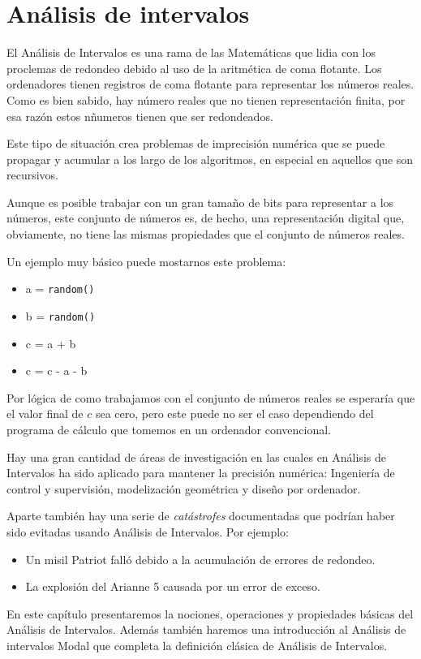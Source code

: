 \chapter{Análisis de intervalos}

El Análisis de Intervalos es una rama de las Matemáticas que lidia con los proclemas de redondeo debido al uso de la aritmética de coma flotante. Los ordenadores tienen registros de coma flotante para representar los números reales. Como es bien sabido, hay número reales que no tienen representación finita, por esa razón estos nñumeros tienen que ser redondeados.
\par Este tipo de situación crea problemas de imprecisión numérica que se puede propagar y acumular a los largo de los algoritmos, en especial en aquellos que son recursivos.
\par Aunque es posible trabajar con un gran tamaño de bits para representar a los números, este conjunto de números es, de hecho, una representación digital que, obviamente, no tiene las mismas propiedades que el conjunto de números reales.
\par Un ejemplo muy básico puede mostarnos este problema:
\begin{itemize}
	\item a = \texttt{random()}
	\item b = \texttt{random()}
	\item c = a + b
	\item c = c - a - b
\end{itemize}
Por lógica de como trabajamos con el conjunto de números reales se esperaría que el valor final de $c$ sea cero, pero este puede no ser el caso dependiendo del programa de cálculo que tomemos en un ordenador convencional.
\par Hay una gran cantidad de áreas de investigación en las cuales en Análisis de Intervalos ha sido aplicado para mantener la precisión numérica: Ingeniería de control y supervisión, modelización geométrica y diseño por ordenador.
\par Aparte también hay una serie de{ \em catástrofes} documentadas que podrían haber sido evitadas usando Análisis de Intervalos. Por ejemplo:
\begin{itemize}
	\item Un misil Patriot falló debido a la acumulación de errores de redondeo.
	\item La explosión del Arianne 5 causada por un error de exceso.
\end{itemize}
En este capítulo presentaremos la nociones, operaciones y propiedades básicas del Análisis de Intervalos. Además también haremos una introducción al Análisis de intervalos Modal que completa la definición clásica de Análisis de Intervalos.

